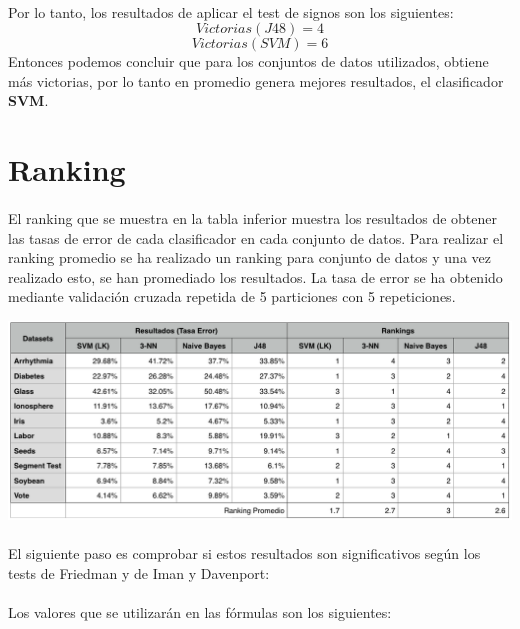 \documentclass[10pt, a4paper,spanish]{article}
\begin{document}
		\paragraph{}
		Por lo tanto, los resultados de aplicar el test de signos son los siguientes:
		\[Victorias(J48) = 4\]
		\[Victorias(SVM) = 6\]
		Entonces podemos concluir que para los conjuntos de datos utilizados, obtiene más victorias, por lo tanto en promedio genera mejores resultados, el clasificador \textbf{SVM}.

	\section{Ranking}

		\paragraph{}
		El ranking que se muestra en la tabla inferior muestra los resultados de obtener las tasas de error de cada clasificador en cada conjunto de datos. Para realizar el ranking promedio se ha realizado un ranking para conjunto de datos y una vez realizado esto, se han promediado los resultados. La tasa de error se ha obtenido mediante validación cruzada repetida de 5 particiones con 5 repeticiones.

		\begin{center}
			\includegraphics[width=\textwidth]{ranking-table}
		\end{center}

		\paragraph{}
		El siguiente paso es comprobar si estos resultados son significativos según los tests de Friedman y de Iman y Davenport:

		\paragraph{}
		Los valores que se utilizarán en las fórmulas son los siguientes:
\end{document}
